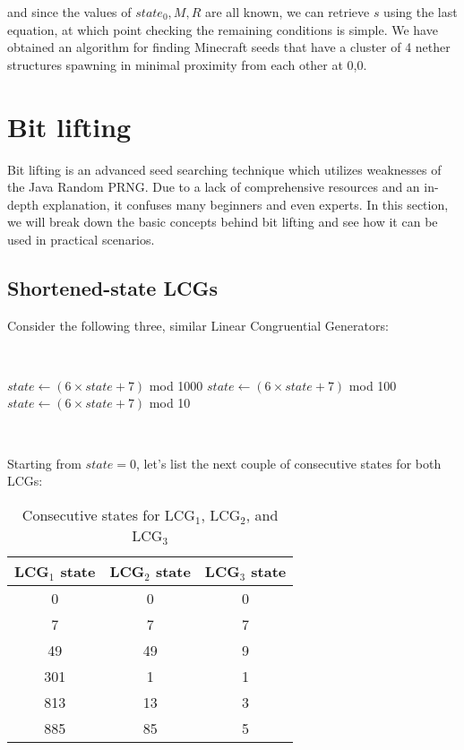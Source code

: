 \documentclass{article}
\begin{document}
and since the values of $state_0, M, R$ are all known, we can retrieve $s$ using the last equation, at which point checking the remaining conditions is simple. We have obtained an algorithm for finding Minecraft seeds that have a cluster of 4 nether structures spawning in minimal proximity from each other at 0,0. %


\section{Bit lifting}

Bit lifting is an advanced seed searching technique which utilizes weaknesses of the Java Random PRNG. Due to a lack of comprehensive resources and an in-depth explanation, it confuses many beginners and even experts. In this section, we will break down the basic concepts behind bit lifting and see how it can be used in practical scenarios.

\subsection{Shortened-state LCGs}

Consider the following three, similar Linear Congruential Generators:

\
\begin{algorithmic}
    \State $state \gets (6 \times state + 7)$ mod 1000
    \State $state \gets (6 \times state + 7)$ mod 100
    \State $state \gets (6 \times state + 7)$ mod 10
\end{algorithmic}
\ \

\noindent Starting from $state = 0$, let’s list the next couple of consecutive states for both LCGs:

\begin{table}[h]
    \centering
    \begin{tabular}{|c|c|c|}
    \hline
         LCG$_1$ state & LCG$_2$ state & LCG$_3$ state \\
    \hline
         0 & 0 & 0   \\
         7 & 7 & 7   \\
         49 & 49 & 9  \\
         301 & 1 & 1   \\
         813 & 13 & 3  \\
         885 & 85 & 5  \\
    \hline
    \end{tabular}
    \caption{Consecutive states for LCG$_1$, LCG$_2$, and LCG$_3$}
    \label{tab:lcgs}
\end{table}
\end{document}
